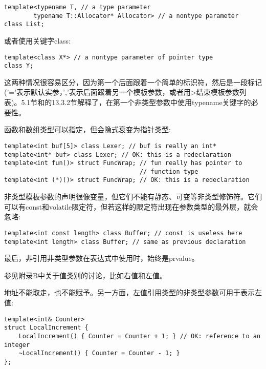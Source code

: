 \begin{lstlisting}[style=styleCXX]
template<typename T, // a type parameter
		typename T::Allocator* Allocator> // a nontype parameter
class List;
\end{lstlisting}

或者使用关键字class:

\begin{lstlisting}[style=styleCXX]
template<class X*> // a nontype parameter of pointer type
class Y;
\end{lstlisting}

这两种情况很容易区分，因为第一个后面跟着一个简单的标识符，然后是一段标记('='表示默认实参，','表示后面跟着另一个模板参数，或者用>结束模板参数列表)。5.1节和的13.3.2节解释了，在第一个非类型参数中使用typename关键字的必要性。

函数和数组类型可以指定，但会隐式衰变为指针类型:

\begin{lstlisting}[style=styleCXX]
template<int buf[5]> class Lexer; // buf is really an int*
template<int* buf> class Lexer; // OK: this is a redeclaration
template<int fun()> struct FuncWrap; // fun really has pointer to
								     // function type
template<int (*)()> struct FuncWrap; // OK: this is a redeclaration
\end{lstlisting}

非类型模板参数的声明很像变量，但它们不能有静态、可变等非类型修饰符。它们可以有const和volatile限定符，但若这样的限定符出现在参数类型的最外层，就会忽略:

\begin{lstlisting}[style=styleCXX]
template<int const length> class Buffer; // const is useless here
template<int length> class Buffer; // same as previous declaration
\end{lstlisting}

最后，非引用非类型参数在表达式中使用时，始终是prvalue。 

\begin{tcolorbox}[colback=webgreen!5!white,colframe=webgreen!75!black]
\hspace*{0.75cm}参见附录B中关于值类别的讨论，比如右值和左值。
\end{tcolorbox}

地址不能取走，也不能赋予。另一方面，左值引用类型的非类型参数可用于表示左值:

\begin{lstlisting}[style=styleCXX]
template<int& Counter>
struct LocalIncrement {
	LocalIncrement() { Counter = Counter + 1; } // OK: reference to an integer
	~LocalIncrement() { Counter = Counter - 1; }
};
\end{lstlisting}

